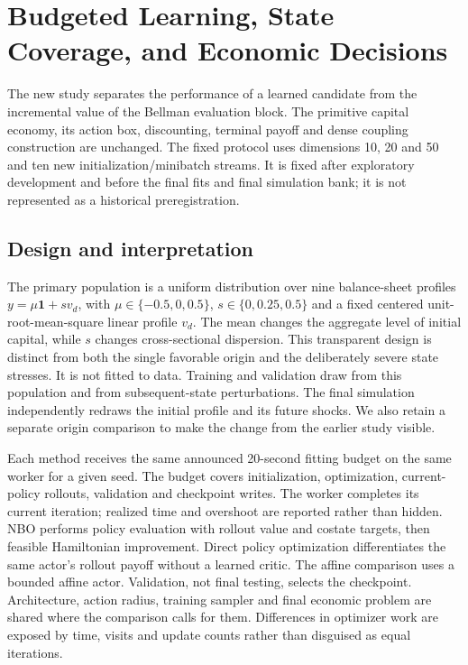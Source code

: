 \section{Budgeted Learning, State Coverage, and Economic Decisions}\label{sec:r12study}
The new study separates the performance of a learned candidate from the incremental value of the Bellman evaluation block. The primitive capital economy, its action box, discounting, terminal payoff and dense coupling construction are unchanged. The fixed protocol uses dimensions 10, 20 and 50 and ten new initialization/minibatch streams. It is fixed after exploratory development and before the final fits and final simulation bank; it is not represented as a historical preregistration.

\subsection{Design and interpretation}
The primary population is a uniform distribution over nine balance-sheet profiles $y=\mu\bm1+sv_d$, with $\mu\in\{-0.5,0,0.5\}$, $s\in\{0,0.25,0.5\}$ and a fixed centered unit-root-mean-square linear profile $v_d$. The mean changes the aggregate level of initial capital, while $s$ changes cross-sectional dispersion. This transparent design is distinct from both the single favorable origin and the deliberately severe state stresses. It is not fitted to data. Training and validation draw from this population and from subsequent-state perturbations. The final simulation independently redraws the initial profile and its future shocks. We also retain a separate origin comparison to make the change from the earlier study visible.

Each method receives the same announced 20-second fitting budget on the same worker for a given seed. The budget covers initialization, optimization, current-policy rollouts, validation and checkpoint writes. The worker completes its current iteration; realized time and overshoot are reported rather than hidden. NBO performs policy evaluation with rollout value and costate targets, then feasible Hamiltonian improvement. Direct policy optimization differentiates the same actor's rollout payoff without a learned critic. The affine comparison uses a bounded affine actor. Validation, not final testing, selects the checkpoint. Architecture, action radius, training sampler and final economic problem are shared where the comparison calls for them. Differences in optimizer work are exposed by time, visits and update counts rather than disguised as equal iterations.

